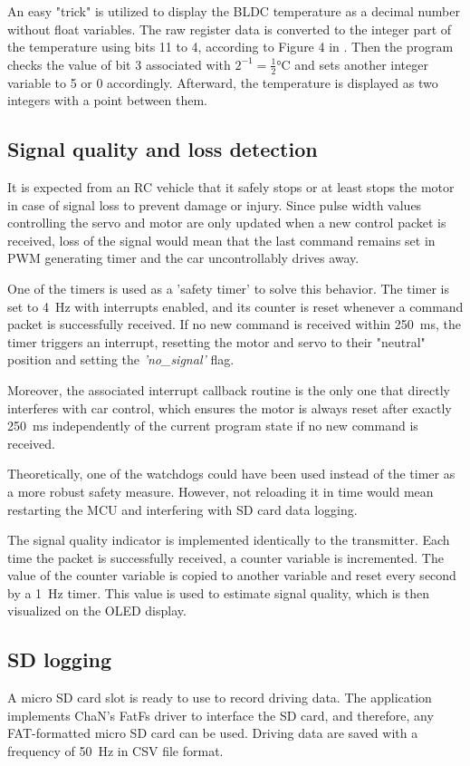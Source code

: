 An easy "trick" is utilized to display the BLDC temperature as a decimal number without float variables. The raw register data is converted to the integer part of the temperature using bits 11 to 4, according to Figure 4 in \cite{ds_datasheet}. Then the program checks the value of bit 3 associated with $2^{-1} = \frac{1}{2}$\unit{\celsius} and sets another integer variable to 5 or 0 accordingly. Afterward, the temperature is displayed as two integers with a point between them.

\subsection{Signal quality and loss detection}
\label{sub:safety}
It is expected from an RC vehicle that it safely stops or at least stops the motor in case of signal loss to prevent damage or injury. Since pulse width values controlling the servo and motor are only updated when a new control packet is received, loss of the signal would mean that the last command remains set in PWM generating timer and the car uncontrollably drives away.

One of the timers is used as a 'safety timer' to solve this behavior. The timer is set to \SI{4}{\Hz} with interrupts enabled, and its counter is reset whenever a command packet is successfully received. If no new command is received within \SI{250}{\ms}, the timer triggers an interrupt, resetting the motor and servo to their "neutral" position and setting the \textit{'no\_signal'} flag. 

Moreover, the associated interrupt callback routine is the only one that directly interferes with car control, which ensures the motor is always reset after exactly \SI{250}{\ms} independently of the current program state if no new command is received.

Theoretically, one of the watchdogs could have been used instead of the timer as a more robust safety measure. However, not reloading it in time would mean restarting the MCU and interfering with SD card data logging.

The signal quality indicator is implemented identically to the transmitter. Each time the packet is successfully received, a counter variable is incremented. The value of the counter variable is copied to another variable and reset every second by a \SI{1}{\Hz} timer. This value is used to estimate signal quality, which is then visualized on the OLED display.

\subsection{SD logging}
A micro SD card slot is ready to use to record driving data. The application implements ChaN's FatFs driver to interface the SD card, and therefore, any FAT-formatted micro SD card can be used. Driving data are saved with a frequency of \SI{50}{\Hz} in CSV file format.

